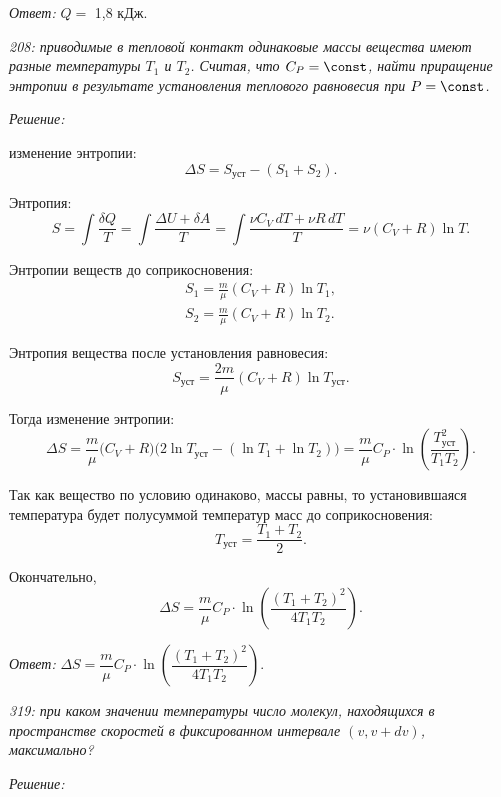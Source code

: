\documentclass[pscyr]{hedsemwork}
\begin{document}
\vspace*{2em}
\emph{Ответ:} \( Q = \) 1,8 кДж.

\newpage %

\emph{208: приводимые в тепловой контакт одинаковые массы вещества имеют разные
температуры \( T_1 \) и \( T_2 \). Считая, что \( C_P = \const \), найти
приращение энтропии в результате установления теплового равновесия при
\( P = \const \).}

\vspace*{2em}
\emph{Решение:}

изменение энтропии:
\[
  \Delta S = S_\text{уст} - (S_1 + S_2).
\]

Энтропия:
\[
  S = \int\frac{\delta Q}{T} = \int\frac{\Delta U + \delta A}{T} =
    \int\frac{\nu C_V\,dT + \nu R\,dT}{T} = \nu(C_V + R)\ln T.
\]

Энтропии веществ до соприкосновения:
\begin{gather*}
  S_1 = \frac{m}{\mu}(C_V + R)\ln T_1, \\
  S_2 = \frac{m}{\mu}(C_V + R)\ln T_2.
\end{gather*}

Энтропия вещества после установления равновесия:
\[
  S_\text{уст} = \frac{2m}{\mu}(C_V + R)\ln T_\text{уст}.
\]

Тогда изменение энтропии:
\[
  \Delta S = \frac{m}{\mu}\big (C_V + R \big)\big(2\ln T_\text{уст} -
    (\ln T_1 + \ln T_2)\big) =
    \frac{m}{\mu}C_P\cdot\ln\left( \frac{T_\text{уст}^2}{T_1T_2} \right).
\]

Так как вещество по условию одинаково, массы равны, то установившаяся
температура будет полусуммой температур масс до соприкосновения:
\[
  T_\text{уст} = \frac{T_1 + T_2}{2}.
\]

Окончательно,
\[
  \Delta S = \frac{m}{\mu}C_P\cdot
    \ln\left( \frac{(T_1 + T_2)^2}{4T_1T_2} \right).
\]

\vspace*{2em}
\emph{Ответ:} \( \Delta S = \dfrac{m}{\mu}C_P\cdot
  \ln \left( \dfrac{(T_1 + T_2)^2}{4T_1T_2} \right) \).

\newpage %

\emph{319: при каком значении температуры число молекул, находящихся в
пространстве скоростей в фиксированном интервале \( (v, v + dv) \), максимально?}

\vspace*{2em}
\emph{Решение:}
\end{document}
